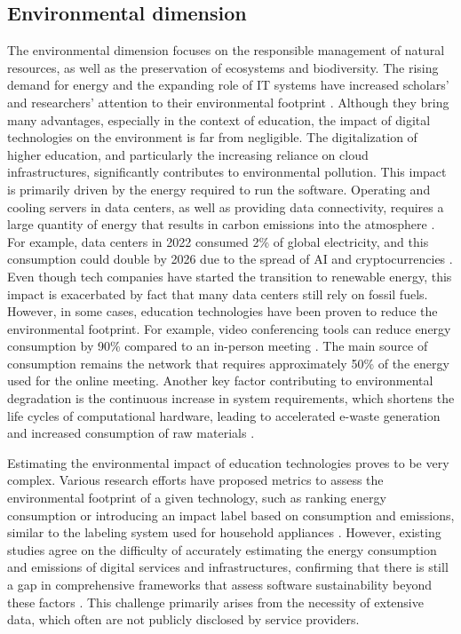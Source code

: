 \subsection{Environmental dimension}
\label{subsec:environmental_dimension}
The environmental dimension focuses on the responsible management of natural resources, as well as the preservation of ecosystems and biodiversity. The rising demand for energy and the expanding role of IT systems have increased scholars’ and researchers’ attention to their environmental footprint \cite{lago_framing_2015}. Although they bring many advantages, especially in the context of education, the impact of digital technologies on the environment is far from negligible. 
The digitalization of higher education, and particularly the increasing reliance on cloud infrastructures, significantly contributes to environmental pollution. This impact is primarily driven by the energy required to run the software. Operating and cooling servers in data centers, as well as providing data connectivity, requires a large quantity of energy that results in carbon emissions into the atmosphere \cite{andrikopoulos_software_2021}.  For example, data centers in 2022 consumed 2\% of global electricity, and this consumption could double by 2026 due to the spread of AI and cryptocurrencies \cite{khosravi_review_2024}. Even though tech companies have started the transition to renewable energy\cite{khosravi_review_2024}, this impact is exacerbated by fact that many data centers still rely on fossil fuels.
However, in some cases, education technologies have been proven to reduce the environmental footprint. For example, video conferencing tools can reduce energy consumption by 90\% compared to an in-person meeting \cite{angeli_conceptualising_2022}. The main source of consumption remains the network that requires approximately 50\% of the energy used for the online meeting.
Another key factor contributing to environmental degradation is the continuous increase in system requirements, which shortens the life cycles of computational hardware, leading to accelerated e-waste generation and increased consumption of raw materials \cite{angeli_conceptualising_2022}.

Estimating the environmental impact of education technologies proves to be very complex. Various research efforts have proposed metrics to assess the environmental footprint of a given technology, such as ranking energy consumption \cite{hindle_green_2016} or introducing an impact label based on consumption and emissions, similar to the labeling system used for household appliances \cite{andrikopoulos_software_2021}. However, existing studies agree on the difficulty of accurately estimating the energy consumption and emissions of digital services and infrastructures, confirming that there is still a gap in comprehensive frameworks that assess software sustainability beyond these factors \cite{lago_framing_2015}. This challenge primarily arises from the necessity of extensive data, which often are not publicly disclosed by service providers.

